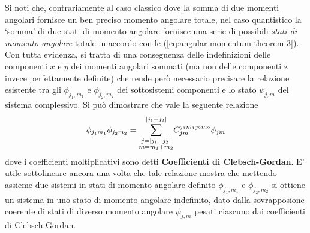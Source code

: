 Si noti che, contrariamente al caso classico dove la somma di due momenti angolari fornisce un ben preciso momento angolare totale, nel
caso quantistico la ‘somma’ di due stati di momento angolare fornisce una serie di possibili \emph{stati di momento angolare} 
totale in accordo con le (\ref{eq:angular-momentum-theorem-3}). 
Con tutta evidenza, si tratta di una conseguenza delle indefinizioni delle componenti $x$ e $y$ dei momenti angolari sommati 
(ma non delle componenti z invece perfettamente definite) che rende però necessario precisare la relazione esistente tra gli
$ \phi_{j_1,m_1}$ e $ \phi_{j_2,m_2}$ dei sottosistemi componenti e lo stato $ \psi_{j,m}$ del sistema complessivo.
Si può dimostrare che vale la seguente relazione
\begin{equation}
    \phi_{j_{1}m_{1}} \phi_{j_{2}m_{2}} = \mathlarger{\sum}_{\substack{j=| j_{1}-j_{2}| \\ m = m_{1}+m_{2}} }^{| j_{1}+j_{2}|} C_{jm}^{j_{1}m_{1}j_{2}m_{2}} \phi_{jm}
   \label{eq:clebsch-gordan-def}
\end{equation}
dove i coefficienti moltiplicativi sono detti \textbf{Coefficienti di Clebsch-Gordan}.
E’ utile sottolineare ancora una volta che tale relazione mostra che mettendo assieme due sistemi in stati di momento angolare definito $\phi_{j_{1},m_{1}}$ e $\phi_{j_{2},m_{2}}$ si ottiene un sistema in uno stato di momento angolare indefinito, dato dalla sovrapposione coerente di stati di diverso momento angolare $\psi_{j,m}$ pesati ciascuno dai coefficienti di Clebsch-Gordan.

